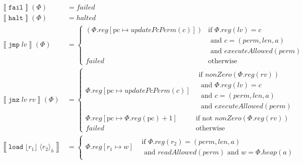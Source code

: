 \documentclass{article}
\newcommand{\update}[2]{[#1 \mapsto #2]}%
\newcommand{\var}[1]{\mathit{#1}}
\newcommand{\rv}{rv}
\newcommand{\lv}{lv}
\newcommand{\pcreg}{\mathrm{pc}}
\newcommand{\addr}{a}
\newcommand{\len}{len}
\newcommand{\reg}{reg}
\newcommand{\heap}{heap}
\newcommand{\perm}{perm}
\newcommand{\failed}{failed}
\newcommand{\halted}{halted}
\newcommand{\updatePcPerm}{\mathit{updatePcPerm}}
\newcommand{\executeAllowed}{\mathit{executeAllowed}}
\newcommand{\nonZero}[1]{\mathit{nonZero}(#1)}
\newcommand{\readAllowed}[1]{\mathit{readAllowed}(#1)}
\newcommand{\refreg}[1]{\lfloor #1 \rfloor}
\newcommand{\refheap}[1]{\langle #1 \rangle_h}
\newcommand{\instr}[1]{\mathtt{#1}}
\newcommand{\fail}{\instr{fail}}
\newcommand{\halt}{\instr{halt}}
\newcommand{\oneinstr}[2]{\instr{#1} \; #2}
\newcommand{\jmp}[1]{\oneinstr{jmp}{#1}}
\newcommand{\twoinstr}[3]{\instr{#1} \; #2 \; #3}
\newcommand{\jnz}[2]{\twoinstr{jnz}{#1}{#2}}
\newcommand{\load}[2]{\twoinstr{load}{#1}{#2}}
\newcommand{\sem}[1]{\left\llbracket #1 \right\rrbracket}
\begin{document}
\begin{align*}
  \sem{\fail}(\Phi)     & = \failed \\
  \sem{\halt}(\Phi)     & = \halted \\
  \sem{\jmp{\lv}}(\Phi) & = \begin{cases}
                            (\Phi.\reg\update{\pcreg}{\updatePcPerm(c)}) & \text{if }\Phi.reg(lv) = c \\
                                                                         & \text{  and }c=(\perm,\len,\addr)\\
                                                                         & \text{  and }\executeAllowed(\perm)\\
                            \failed & \text{otherwise }
                            \end{cases} \\
  \sem{\jnz{\lv}{\rv}}(\Phi) & = \begin{cases}
                            \Phi.\reg\update{\pcreg}{\updatePcPerm(\var{c})} &
                            \begin{array}{l}
                              \text{if $\nonZero{\Phi.\reg(\rv)}$} \\ 
                              \text{  and $\Phi.reg(lv) = c$} \\
                              \text{  and $c=(\perm,\len,\addr)$}\\
                              \text{  and $\executeAllowed(\perm)$}
                            \end{array}
                            \\ %
                            \Phi.\reg\update{\pcreg}{\Phi.\reg(\pcreg) + 1} & \text{if not $\nonZero{\Phi.\reg(\rv)}$}\\
                            \failed & \text{otherwise }
                            \end{cases} \\
 \sem{\load{\refreg{r_1}}{\refheap{r_2}}} & =
                                 \begin{cases}
                                   \Phi.\reg\update{r_1}{\var{w}} &
                                   \begin{array}{l}
                                     \text{if }\Phi.\reg(r_2) = (\perm,\len,\addr)\\
                                     \text{  and }\readAllowed{\perm} \text{ and } \var{w} = \Phi.\heap(\addr)

\end{array}
\end{cases}
\end{align*}
\end{document}
